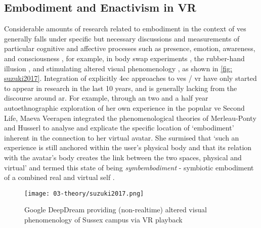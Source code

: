 \subsection{Embodiment and Enactivism in VR}\label{sec: theory-embodimentvr}
Considerable amounts of research related to embodiment in the context of \glspl{ve} generally falls under specific but necessary discussions and measurements of particular cognitive and affective processes such as presence, emotion, awareness, and consciousness \citep[]{slater1994,seth2012}, for example, in body swap experiments \citep[]{slater2010}, the rubber-hand illusion \citep[]{suzuki2013}, and stimulating altered visual phenomenology \citep[]{suzuki2017}, as shown in \autoref{fig: suzuki2017}. Integration of explicitly \gls{4ec} approaches to \glspl{ve} / \gls{vr} have only started to appear in research in the last 10 years, and is generally lacking from the discourse around \gls{ar}. For example, through an two and a half year autoethnographic exploration of her own experience in the popular \gls{ve} Second Life, Maeva Veerapen integrated the phenomenological theories of Merleau-Ponty and Husserl to analyse and explicate the specific location of `embodiment' inherent in the connection to her virtual avatar. She surmised that `such an experience is still anchored within the user's physical body and that its relation with the avatar's body creates the link between the two spaces, physical and virtual' and termed this state of being \textit{symbembodiment} - symbiotic embodiment of a combined real and virtual self \citep[]{veerapen2011}. 
\begin{wrapfigure}{r}{0.45\textwidth}
    \hfill
    \begin{minipage}{0.95\linewidth}
        \texttt{[image: 03-theory/suzuki2017.png]}
        \captionsetup{justification=justified}
        \caption{Google DeepDream providing (non-realtime) altered visual phenomenology of Sussex campus via VR playback \citep[from][]{suzuki2017a}}\label{fig: suzuki2017}
    \end{minipage}
\end{wrapfigure}

